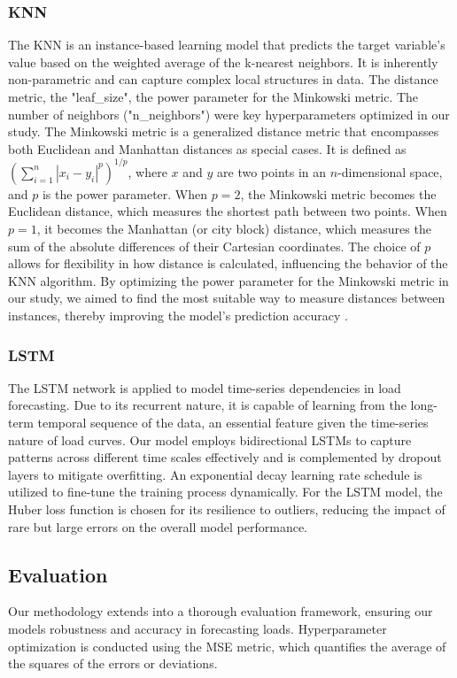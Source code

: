\documentclass{article} %
\begin{document}
\subsubsection{KNN}
The \gls*{KNN} is an instance-based learning model that predicts the target variable's value based on the weighted average of the k-nearest neighbors. It is inherently non-parametric and can capture complex local structures in data. The distance metric, the "leaf\_size", the power parameter for the Minkowski metric. The number of neighbors ("n\_neighbors") were key hyperparameters optimized in our study.  
The Minkowski metric is a generalized distance metric that encompasses both Euclidean and Manhattan distances as special cases. It is defined as $(\sum_{i=1}^{n} |x_i - y_i|^p)^{1/p}$, where $x$ and $y$ are two points in an $n$-dimensional space, and $p$ is the power parameter. When $p=2$, the Minkowski metric becomes the Euclidean distance, which measures the shortest path between two points. When $p=1$, it becomes the Manhattan (or city block) distance, which measures the sum of the absolute differences of their Cartesian coordinates. The choice of $p$ allows for flexibility in how distance is calculated, influencing the behavior of the KNN algorithm. By optimizing the power parameter for the Minkowski metric in our study, we aimed to find the most suitable way to measure distances between instances, thereby improving the model's prediction accuracy \cite{bishop2006pattern}.

\subsubsection{LSTM}
The \gls*{LSTM} network is applied to model time-series dependencies in load forecasting. Due to its recurrent nature, it is capable of learning from the long-term temporal sequence of the data, an essential feature given the time-series nature of load curves. Our model employs bidirectional LSTMs to capture patterns across different time scales effectively and is complemented by dropout layers to mitigate overfitting. An exponential decay learning rate schedule is utilized to fine-tune the training process dynamically. 
For the \gls*{LSTM} model, the Huber loss function is chosen for its resilience to outliers, reducing the impact of rare but large errors on the overall model performance. 

\subsection{Evaluation}
Our methodology extends into a thorough evaluation framework, ensuring our models robustness and accuracy in forecasting loads.
Hyperparameter optimization is conducted using the \gls*{MSE} metric, which quantifies the average of the squares of the errors or deviations. 
\end{document}
